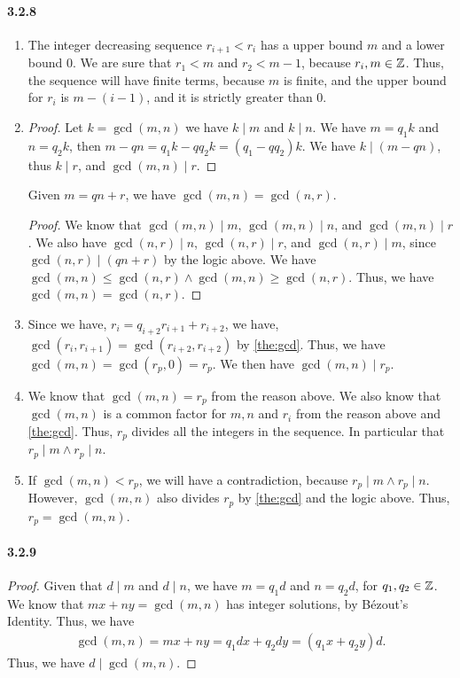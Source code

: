 \documentclass[8pt,twocolumn]{article}
\begin{document}
\paragraph{3.2.8}
\begin{enumerate}
  \item The integer decreasing sequence $r_{i+1}<r_i$ has a upper bound $m$ and
    a lower bound $0$. We are sure that $r_{1}<m$ and $r_{2}<m-1$, because
    $r_i,m\in\mathbb{Z}$. Thus, the sequence will have finite terms, because $m$ is
    finite, and the upper bound for $r_i$ is $m-(i-1)$, and it is strictly
    greater than $0$.
  \item \begin{proof}
    Let $k=\gcd(m,n)$ we have $k\mid m$ and $k\mid n$. We have $m=q_1k$ and
    $n=q_2k$, then $m-qn=q_1k-qq_2k=(q_1-qq_2)k$. We have $k\mid (m-qn)$, thus
    $k\mid r$, and $\gcd(m,n)\mid r$.
  \end{proof}
  \begin{theorem}\label{the:gcd}
    Given $m=qn+r$, we have $\gcd(m,n)=\gcd(n,r)$.
  \end{theorem}
  \begin{proof}
    We know that $\gcd(m,n)\mid m$, $\gcd(m,n)\mid n$, and $\gcd(m,n)\mid r$.
    We also have $\gcd(n,r)\mid n$, $\gcd(n,r)\mid r$, and $\gcd(n,r)\mid m$,
    since $\gcd(n,r)\mid (qn+r)$ by the logic above. We have
    $\gcd(m,n)\le\gcd(n,r)\land \gcd(m,n)\ge\gcd(n,r)$. Thus, we have
    $\gcd(m,n)=\gcd(n,r)$.
  \end{proof}
  \item \label{list:gcd} Since we have, $r_{i}=q_{i+2}r_{i+1}+r_{i+2}$, we
    have, $\gcd(r_i, r_{i+1}) = \gcd(r_{i+2},r_{i+2})$ by \cref{the:gcd}. Thus,
    we have $\gcd(m,n) = \gcd(r_p,0)=r_p$. We then have $\gcd(m,n)\mid r_p$.
  \item We know that $\gcd(m,n) = r_p$ from the reason above. We also know that
    $\gcd(m,n)$ is a common factor for $m,n$ and $r_i$ from the reason above
    and \cref{the:gcd}. Thus, $r_p$ divides all the integers in the sequence.
    In particular that $r_p\mid m\land r_p\mid n$.
  \item If $\gcd(m,n)<r_p$, we will have a contradiction, because $r_p\mid
    m\land r_p\mid n$. However, $\gcd(m,n)$ also divides $r_p$ by
    \cref{the:gcd} and the logic above. Thus, $r_p=\gcd(m,n)$.
\end{enumerate}

\paragraph{3.2.9}
\begin{proof}
  Given that $d\mid m$ and $d\mid n$, we have $m=q_1d$ and $n=q_2d$, for
  $q_1,q_2\in\mathbb{Z}$. We know that $mx+ny=\gcd(m,n)$ has integer solutions, by
  B\'ezout's Identity. Thus, we have
  \begin{align*}
    \gcd(m,n) = mx+ny = q_1d x + q_2 d y = (q_1x + q_2y)d.
  \end{align*}
  Thus, we have $d\mid \gcd(m,n)$.
\end{proof}
\end{document}
